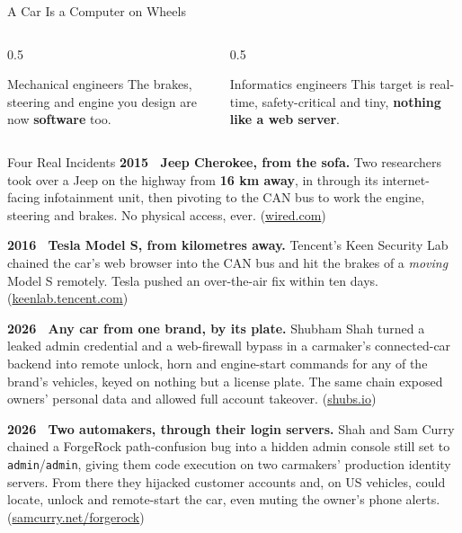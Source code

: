 \begin{frame}{A Car Is a Computer on Wheels}
  \vspace{1mm}
  \begin{columns}[T]
    \begin{column}{0.5\textwidth}
      \begin{block}{Mechanical engineers}
        The brakes, steering and engine you design are now \textbf{software} too.
      \end{block}
    \end{column}
    \begin{column}{0.5\textwidth}
      \begin{block}{Informatics engineers}
        This target is real-time, safety-critical and tiny, \textbf{nothing like a web server}.
      \end{block}
    \end{column}
  \end{columns}
\end{frame}

\begin{frame}{Four Real Incidents}
  \small
  \textbf{2015 \textbullet\ Jeep Cherokee, from the sofa.} Two researchers took over a Jeep on the highway from \textbf{16 km away}, in through its internet-facing infotainment unit, then pivoting to the CAN bus to work the engine, steering and brakes. No physical access, ever. {\scriptsize(\href{https://www.wired.com/2015/07/hackers-remotely-kill-jeep-highway/}{wired.com})}

  \vspace{1.2mm}
  \textbf{2016 \textbullet\ Tesla Model S, from kilometres away.} Tencent's Keen Security Lab chained the car's web browser into the CAN bus and hit the brakes of a \emph{moving} Model S remotely. Tesla pushed an over-the-air fix within ten days. {\scriptsize(\href{https://keenlab.tencent.com/en/2016/09/19/Keen-Security-Lab-of-Tencent-Car-Hacking-Research-Remote-Attack-to-Tesla-Cars/}{keenlab.tencent.com})}

  \vspace{1.2mm}
  \textbf{2026 \textbullet\ Any car from one brand, by its plate.} Shubham Shah turned a leaked admin credential and a web-firewall bypass in a carmaker's connected-car backend into remote unlock, horn and engine-start commands for any of the brand's vehicles, keyed on nothing but a license plate. The same chain exposed owners' personal data and allowed full account takeover. {\scriptsize(\href{https://shubs.io/unlocking-any-car-from-x-brand-in-most-of-the-world/}{shubs.io})}

  \vspace{1.2mm}
  \textbf{2026 \textbullet\ Two automakers, through their login servers.} Shah and Sam Curry chained a ForgeRock path-confusion bug into a hidden admin console still set to \texttt{admin}/\texttt{admin}, giving them code execution on two carmakers' production identity servers. From there they hijacked customer accounts and, on US vehicles, could locate, unlock and remote-start the car, even muting the owner's phone alerts. {\scriptsize(\href{https://samcurry.net/forgerock}{samcurry.net/forgerock})}
\end{frame}

